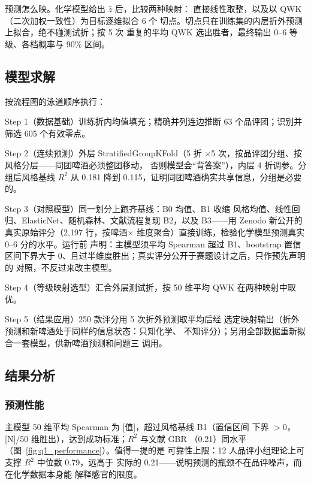 \documentclass[12pt,a4paper]{article}
\begin{document}
预测怎么映。化学模型给出 $\hat z$ 后，比较两种映射：
直接线性取整，以及以 QWK（二次加权一致性）为目标逐维拟合 6 个
切点。切点只在训练集的内层折外预测上拟合，绝不碰测试折；按 5 次
重复的平均 QWK 选出胜者，最终输出 0--6 等级、各档概率与 90\%
区间。

\subsection{模型求解}

按流程图的泳道顺序执行：

Step 1（数据基础）训练折内均值填充；精确并列连边推断
63 个品评团；识别并筛选 605 个有效零点。

Step 2（连续预测）外层 StratifiedGroupKFold（5 折
$\times$5 次，按品评团分组、按风格分层——同团啤酒必须整团移动，
否则模型会``背答案''），内层 4 折调参。分组后风格基线 $R^2$ 从
0.181 降到 0.115，证明同团啤酒确实共享信息，分组是必要的。

Step 3（对照模型）同一划分上跑齐基线：B0 均值、B1 收缩
风格均值、线性回归、ElasticNet、随机森林、文献流程复现 B2，以及
B3——用 Zenodo 新公开的真实原始评分（2{,}197 行，按啤酒$\times$
维度聚合）直接训练，检验化学模型预测真实 0--6 分的水平。运行前
声明：主模型须平均 Spearman 超过 B1、bootstrap 置信区间下界大于
0、且过半维度胜出；真实评分公开于赛题设计之后，只作预先声明的
对照，不反过来改主模型。

Step 4（等级映射选型）汇合外层测试折，按 50 维平均 QWK
在两种映射中取优。

Step 5（结果应用）250 款评分用 5 次折外预测取平均后经
选定映射输出（折外预测和新啤酒处于同样的信息状态：只知化学、
不知评分）；另用全部数据重新拟合一套模型，供新啤酒预测和问题三
调用。

\subsection{结果分析}

\subsubsection{预测性能}

主模型 50 维平均 Spearman 为 [值]，超过风格基线 B1（置信区间
下界 $>0$，[N]/50 维胜出），达到成功标准；$R^2$ 与文献 GBR
（0.21）同水平（图~\ref{fig:q1_performance}）。值得一提的是
可靠性上限：12 人品评小组理论上可支撑 $R^2$ 中位数 0.79，远高于
实际的 0.21——说明预测的瓶颈不在品评噪声，而在化学数据本身能
解释感官的限度。

\end{document}
